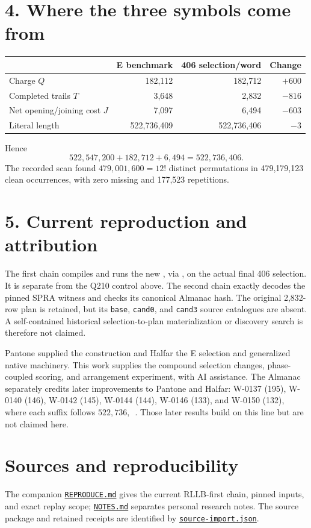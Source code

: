 \documentclass[11pt]{article}
\begin{document}
\section*{4. Where the three symbols come from}
\begin{center}
\begin{tabular}{lrrr}\toprule
 &E benchmark&406 selection/word&Change\\\midrule
Charge $Q$&182,112&182,712&$+600$\\
Completed trails $T$&3,648&2,832&$-816$\\
Net opening/joining cost $J$&7,097&6,494&$-603$\\\midrule
Literal length&522,736,409&522,736,406&$-3$\\\bottomrule
\end{tabular}\end{center}
Hence
\[
\boxed{522{,}547{,}200+182{,}712+6{,}494=522{,}736{,}406.}
\]
The recorded scan found $479{,}001{,}600=12!$ distinct permutations in
479,179,123 clean occurrences, with zero missing and 177,523 repetitions.

\section*{5. Current reproduction and attribution}
The first chain compiles and runs the new , via
, on the actual final 406 selection. It is separate from
the Q210 control above. The second chain exactly decodes the pinned SPRA
witness and checks its canonical Almanac hash. The original 2,832-row
plan is retained, but its \texttt{base}, \texttt{cand0}, and \texttt{cand3}
source catalogues are absent. A self-contained historical selection-to-plan
materialization or discovery search is therefore not claimed.

Pantone supplied the construction and Halfar the E selection and generalized
native machinery. This work supplies the compound selection changes,
phase-coupled scoring, and arrangement experiment, with AI assistance.
The Almanac separately credits later improvements to Pantone and Halfar:
W-0137 (195), W-0140 (146), W-0142 (145), W-0144 (144), W-0146 (133), and
W-0150 (132), where each suffix follows $522{,}736{,}$~\cite{almanac}.
Those later results build on this line but are not claimed here.

\section*{Sources and reproducibility}
The companion \href{REPRODUCE.md}{\texttt{REPRODUCE.md}} gives the current
RLLB-first chain, pinned inputs, and exact replay scope;
\href{NOTES.md}{\texttt{NOTES.md}} separates personal research notes.
The source package and retained receipts are identified by
\href{source-import.json}{\texttt{source-import.json}}.
\end{document}
